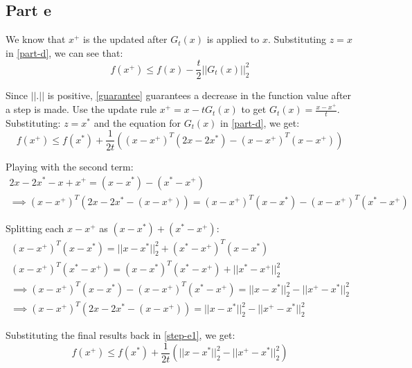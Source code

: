 \documentclass[11pt]{article}
\begin{document}
\begin{flushleft}
\subsection*{Part e}
We know that \(x^{+}\) is the updated after \(G_{t}(x)\) is applied to \(x\). Substituting \(z = x\) in \ref{part-d}, we can see that:
\begin{equation}
\label{guarantee}
f(x^{+}) \leq f(x) - \frac{t}{2}||G_{t}(x)||_{2}^{2}
\end{equation}

Since \(||.||\) is positive, \ref{guarantee} guarantees a decrease in the function value after a step is made. Use the update rule \(x^{+} = x - tG_{t}(x)\) to get \(G_{t}(x) = \frac{x - x^{+}}{t}\). Substituting: \(z = x^{*}\) and the equation for \(G_{t}(x)\) in \ref{part-d}, we get:
\begin{equation}
\label{step-e1}
f(x^{+}) \leq f(x^{*}) + \frac{1}{2t}\left((x - x^{+})^{T}(2x - 2x^{*}) - (x - x^{+})^{T}(x - x^{+})\right)
\end{equation}

Playing with the second term:
\begin{gather*}
2x - 2x^{*} - x + x^{+} = (x - x^{*}) - (x^{*} - x^{+}) \\
\implies (x - x^{+})^{T}(2x - 2x^{*} - (x - x^{+})) = (x - x^{+})^{T}(x - x^{*}) - (x - x^{+})^{T}(x^{*} - x^{+})
\end{gather*}

Splitting each \(x - x^{+}\) as \((x - x^{*}) + (x^{*} - x^{+})\):
\begin{gather*}
(x - x^{+})^{T}(x - x^{*}) = ||x - x^{*}||_{2}^{2} + (x^{*} - x^{+})^{T}(x - x^{*}) \\
(x - x^{+})^{T}(x^{*} - x^{+}) = (x - x^{*})^{T}(x^{*} - x^{+}) + ||x^{*} - x^{+}||_{2}^{2} \\
\implies (x - x^{+})^{T}(x - x^{*}) - (x - x^{+})^{T}(x^{*} - x^{+}) = ||x - x^{*}||_{2}^{2} - ||x^{+} - x^{*}||_{2}^{2} \\
\implies (x - x^{+})^{T}(2x - 2x^{*} - (x - x^{+})) = ||x - x^{*}||_{2}^{2} - ||x^{+} - x^{*}||_{2}^{2}
\end{gather*}

Substituting the final results back in \ref{step-e1}, we get:
\begin{equation}
\label{part-e}
f(x^{+}) \leq f(x^{*}) + \frac{1}{2t}\left(||x - x^{*}||_{2}^{2} - ||x^{+} - x^{*}||_{2}^{2}\right)
\end{equation}
\end{flushleft}
\end{document}

